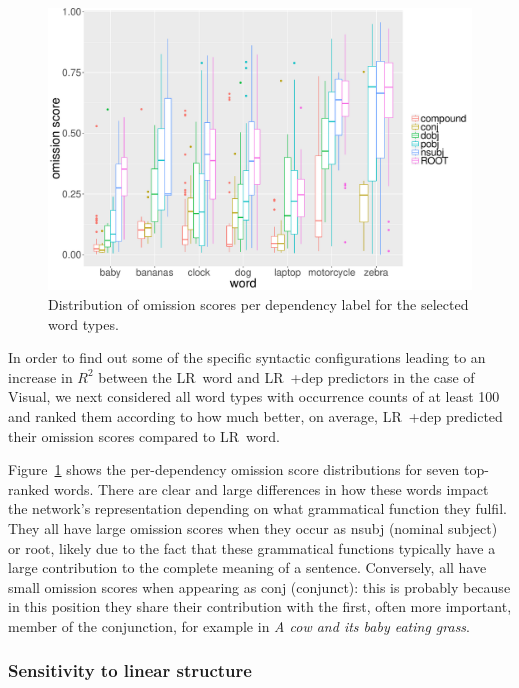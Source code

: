 \begin{figure}[t]
  \centering
  \includegraphics[scale=0.35]{chapters/COLI/top_words.pdf}
  \caption{Distribution of omission scores per dependency label for the selected word types.}
  \label{fig:top_words}
\end{figure}


In order to find out some of the specific syntactic configurations leading to
an increase in $R^2$ between the {\sc LR~word} and {\sc LR~+dep} predictors
in the case of {\sc Visual}, we next considered all word types with
occurrence counts of at least 100 and ranked them according to how much
better, on average, {\sc LR~+dep} predicted their omission scores
compared to {\sc LR~word}.

Figure~\ref{fig:top_words} shows the per-dependency
omission score distributions for seven top-ranked words.
There are clear and large differences in how these words
impact the network's representation depending on what grammatical
function they fulfil. They all have large omission scores when they
occur as {\sc nsubj} (nominal subject) or {\sc root}, likely due to the fact that these
grammatical functions typically have a large contribution to the
complete meaning of a sentence.  Conversely, all have small omission
scores when appearing as {\sc conj} (conjunct): this is probably because in this position
they share their contribution with the first, often more important,
member of the conjunction, for example in {\it A cow and its baby eating
  grass}.

\subsubsection{Sensitivity to linear structure}
\label{subsec:information-struct}

